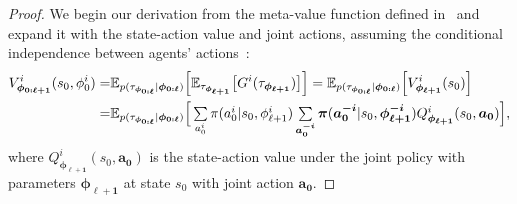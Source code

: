 \begin{proof}
We begin our derivation from the meta-value function defined in~ and expand it with the state-action value and joint actions, assuming the conditional independence between agents' actions~\citep{wen2018probabilistic}: 
\begin{align}\label{eqn:theorem-step1}
\begin{split}
V^{i}_{\bm{\phi}_{\bm{0:\ell+1}}}(s_0,\phi^{i}_{0})=
&\mathbb{E}_{{p(\tau_{\bm{\phi}_{\bm{0:\ell}}}}|\bm{\phi}_{\bm{0:\ell}})}\Big[\mathbb{E}_{\tau_{\bm{\phi}_{\bm{\ell+1}}}}\big[G^{i}(\tau_{\bm{\phi}_{\bm{\ell+1}}})\big]\Big]=\mathbb{E}_{{p(\tau_{\bm{\phi}_{\bm{0:\ell}}}}|\bm{\phi}_{\bm{0:\ell}})}\Big[V^{i}_{\bm{\phi}_{\bm{\ell+1}}}(s_0)\Big]\\
=&\mathbb{E}_{{p(\tau_{\bm{\phi}_{\bm{0:\ell}}}}|\bm{\phi}_{\bm{0:\ell}})}\Big[\textstyle\sum\limits_{a^{i}_{0}}\pi(a^{i}_{0}|s_0,\phi^{i}_{\ell+1})\textstyle\sum\limits_{\bm{a}^{\bm{-i}}_{\bm{0}}}\bm{\pi}(\bm{a}^{\bm{-i}}_{\bm{0}}|s_{0},\bm{\phi}^{\bm{-i}}_{\bm{\ell+1}}) Q^{i}_{\bm{\phi}_{\bm{\ell+1}}}(s_{0},\bm{a}_{\bm{0}})\Big],
\end{split}
\end{align}
where $Q^{i}_{\bm{\phi}_{\bm{\ell+1}}}(s_{0},\bm{a}_{\bm{0}})$ is the state-action value under the joint policy with parameters $\bm{\phi}_{\bm{\ell+1}}$ at state $s_{0}$ with joint action $\bm{a}_{\bm{0}}$.


\end{proof}
